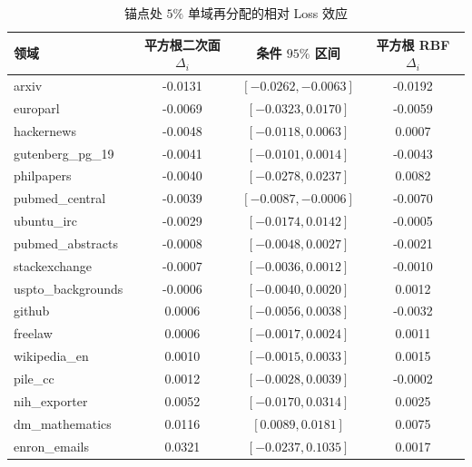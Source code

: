 \begin{table}[H]\centering\scriptsize
\caption{锚点处 $5\%$ 单域再分配的相对 Loss 效应}\label{tab:q1-v39-single}
\begin{tabular}{lccc}\toprule 领域 & 平方根二次面 $\Delta_i$ & 条件 $95\%$ 区间 & 平方根 RBF $\Delta_i$\\\midrule
arxiv & -0.0131 & $[-0.0262,-0.0063]$ & -0.0192 \\
europarl & -0.0069 & $[-0.0323,0.0170]$ & -0.0059 \\
hackernews & -0.0048 & $[-0.0118,0.0063]$ & 0.0007 \\
gutenberg\_pg\_19 & -0.0041 & $[-0.0101,0.0014]$ & -0.0043 \\
philpapers & -0.0040 & $[-0.0278,0.0237]$ & 0.0082 \\
pubmed\_central & -0.0039 & $[-0.0087,-0.0006]$ & -0.0070 \\
ubuntu\_irc & -0.0029 & $[-0.0174,0.0142]$ & -0.0005 \\
pubmed\_abstracts & -0.0008 & $[-0.0048,0.0027]$ & -0.0021 \\
stackexchange & -0.0007 & $[-0.0036,0.0012]$ & -0.0010 \\
uspto\_backgrounds & -0.0006 & $[-0.0040,0.0020]$ & 0.0012 \\
github & 0.0006 & $[-0.0056,0.0038]$ & -0.0032 \\
freelaw & 0.0006 & $[-0.0017,0.0024]$ & 0.0011 \\
wikipedia\_en & 0.0010 & $[-0.0015,0.0033]$ & 0.0015 \\
pile\_cc & 0.0012 & $[-0.0028,0.0039]$ & -0.0002 \\
nih\_exporter & 0.0052 & $[-0.0170,0.0314]$ & 0.0025 \\
dm\_mathematics & 0.0116 & $[0.0089,0.0181]$ & 0.0075 \\
enron\_emails & 0.0321 & $[-0.0237,0.1035]$ & 0.0017 \\
\bottomrule\end{tabular}\end{table}

